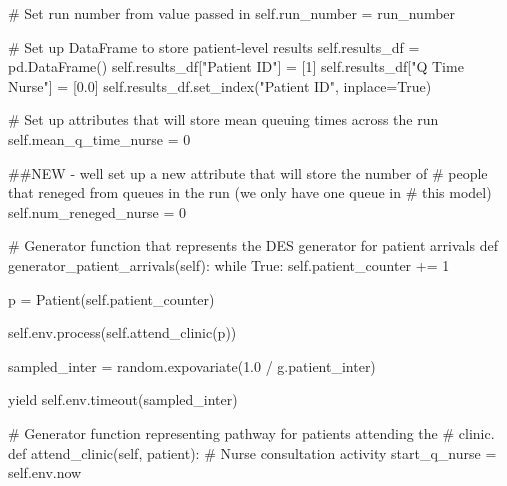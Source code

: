 \documentclass[
  letterpaper,
  DIV=11,
  numbers=noendperiod]{scrreprt}
\newenvironment{Shaded}{\begin{snugshade}}{\end{snugshade}}
\newcommand{\CommentTok}[1]{\textcolor[rgb]{0.37,0.37,0.37}{#1}}
\newcommand{\ControlFlowTok}[1]{\textcolor[rgb]{0.00,0.23,0.31}{#1}}
\newcommand{\DecValTok}[1]{\textcolor[rgb]{0.68,0.00,0.00}{#1}}
\newcommand{\FloatTok}[1]{\textcolor[rgb]{0.68,0.00,0.00}{#1}}
\newcommand{\KeywordTok}[1]{\textcolor[rgb]{0.00,0.23,0.31}{#1}}
\newcommand{\NormalTok}[1]{\textcolor[rgb]{0.00,0.23,0.31}{#1}}
\newcommand{\OperatorTok}[1]{\textcolor[rgb]{0.37,0.37,0.37}{#1}}
\newcommand{\StringTok}[1]{\textcolor[rgb]{0.13,0.47,0.30}{#1}}
\newcommand{\VariableTok}[1]{\textcolor[rgb]{0.07,0.07,0.07}{#1}}
\begin{document}
\begin{tcolorbox}
\begin{Shaded}
\begin{Highlighting}[]
        \CommentTok{\# Set run number from value passed in}
        \VariableTok{self}\NormalTok{.run\_number }\OperatorTok{=}\NormalTok{ run\_number}

        \CommentTok{\# Set up DataFrame to store patient{-}level results}
        \VariableTok{self}\NormalTok{.results\_df }\OperatorTok{=}\NormalTok{ pd.DataFrame()}
        \VariableTok{self}\NormalTok{.results\_df[}\StringTok{"Patient ID"}\NormalTok{] }\OperatorTok{=}\NormalTok{ [}\DecValTok{1}\NormalTok{]}
        \VariableTok{self}\NormalTok{.results\_df[}\StringTok{"Q Time Nurse"}\NormalTok{] }\OperatorTok{=}\NormalTok{ [}\FloatTok{0.0}\NormalTok{]}
        \VariableTok{self}\NormalTok{.results\_df.set\_index(}\StringTok{"Patient ID"}\NormalTok{, inplace}\OperatorTok{=}\VariableTok{True}\NormalTok{)}

        \CommentTok{\# Set up attributes that will store mean queuing times across the run}
        \VariableTok{self}\NormalTok{.mean\_q\_time\_nurse }\OperatorTok{=} \DecValTok{0}

        \CommentTok{\#\#NEW {-} we\textquotesingle{}ll set up a new attribute that will store the number of}
        \CommentTok{\# people that reneged from queues in the run (we only have one queue in}
        \CommentTok{\# this model)}
        \VariableTok{self}\NormalTok{.num\_reneged\_nurse }\OperatorTok{=} \DecValTok{0}

    \CommentTok{\# Generator function that represents the DES generator for patient arrivals}
    \KeywordTok{def}\NormalTok{ generator\_patient\_arrivals(}\VariableTok{self}\NormalTok{):}
        \ControlFlowTok{while} \VariableTok{True}\NormalTok{:}
            \VariableTok{self}\NormalTok{.patient\_counter }\OperatorTok{+=} \DecValTok{1}

\NormalTok{            p }\OperatorTok{=}\NormalTok{ Patient(}\VariableTok{self}\NormalTok{.patient\_counter)}

            \VariableTok{self}\NormalTok{.env.process(}\VariableTok{self}\NormalTok{.attend\_clinic(p))}

\NormalTok{            sampled\_inter }\OperatorTok{=}\NormalTok{ random.expovariate(}\FloatTok{1.0} \OperatorTok{/}\NormalTok{ g.patient\_inter)}

            \ControlFlowTok{yield} \VariableTok{self}\NormalTok{.env.timeout(sampled\_inter)}


    \CommentTok{\# Generator function representing pathway for patients attending the}
    \CommentTok{\# clinic.}
    \KeywordTok{def}\NormalTok{ attend\_clinic(}\VariableTok{self}\NormalTok{, patient):}
        \CommentTok{\# Nurse consultation activity}
\NormalTok{        start\_q\_nurse }\OperatorTok{=} \VariableTok{self}\NormalTok{.env.now}


\end{Highlighting}
\end{Shaded}
\end{tcolorbox}
\end{document}
